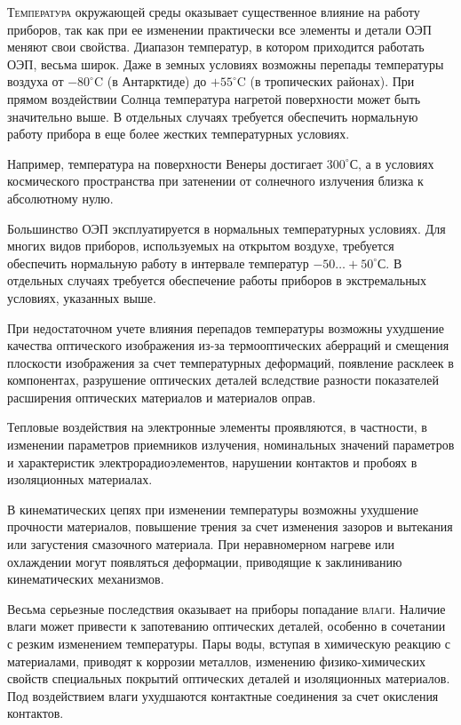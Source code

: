 \textsc{Температура} окружающей среды оказывает существенное влияние на работу приборов, так как при ее изменении практически все элементы и детали ОЭП меняют свои свойства. 
Диапазон температур, в котором приходится работать ОЭП, весьма широк. 
Даже в земных условиях возможны перепады температуры воздуха от $-80^{\circ}$C (в Антарктиде) до $+55^{\circ}$C (в тропических районах). 
При прямом воздействии Солнца температура нагретой поверхности может быть значительно выше. 
В отдельных случаях требуется обеспечить нормальную работу прибора в еще более жестких температурных условиях. 

Например, температура на поверхности Венеры достигает $300^{\circ}$С, а в условиях космического пространства при затенении от солнечного излучения близка к абсолютному нулю.

Большинство ОЭП эксплуатируется в нормальных температурных условиях. 
Для многих видов приборов, используемых на открытом воздухе, требуется обеспечить нормальную работу в интервале температур $-50\ldots+50^{\circ}$С. 
В отдельных случаях требуется обеспечение работы приборов в экстремальных условиях, указанных выше.

При недостаточном учете влияния перепадов температуры возможны ухудшение качества оптического изображения из-за термооптических аберраций и смещения плоскости изображения за счет температурных деформаций, появление расклеек в компонентах, разрушение оптических деталей вследствие разности показателей расширения оптических материалов и материалов оправ.

Тепловые воздействия на электронные элементы проявляются, в частности, в изменении параметров приемников излучения, номинальных значений параметров и характеристик электрорадиоэлементов, нарушении контактов и пробоях в изоляционных материалах.

В кинематических цепях при изменении температуры возможны ухудшение прочности материалов, повышение трения за счет изменения зазоров и вытекания или загустения смазочного материала. При неравномерном нагреве или охлаждении могут появляться деформации, приводящие к заклиниванию кинематических механизмов.

Весьма серьезные последствия оказывает на приборы попадание \textsc{влаги}. 
Наличие влаги может привести к запотеванию оптических деталей, особенно в сочетании с резким изменением температуры. 
Пары воды, вступая в химическую реакцию с материалами, приводят к коррозии металлов, изменению физико-химических свойств специальных покрытий оптических деталей и изоляционных материалов. 
Под воздействием влаги ухудшаются контактные соединения за счет окисления контактов.

